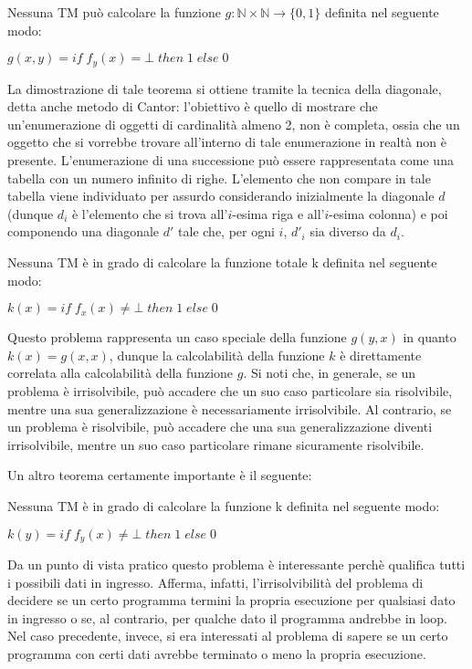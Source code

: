   \begin{theorem} 
    Nessuna TM può calcolare la funzione \(g:\mathbb N\times \mathbb N \to \{0,1\}\) definita nel seguente modo:
    
    \(g(x,y) = if\; f_y(x) = \bot \; then \; 1 \; else \; 0\)
  \end{theorem}

  La dimostrazione di tale teorema si ottiene tramite la tecnica della diagonale, detta anche metodo di Cantor: l'obiettivo è quello di mostrare che un'enumerazione di oggetti di cardinalità almeno 2, non è completa, ossia che un oggetto che si vorrebbe trovare all'interno di tale enumerazione in realtà non è presente. L'enumerazione di una successione può essere rappresentata come una tabella con un numero infinito di righe. L'elemento che non compare in tale tabella viene individuato per assurdo considerando inizialmente la diagonale \(d\) (dunque \(d_i\) è l'elemento che si trova all'\(i\)-esima riga e all'\(i\)-esima colonna) e poi componendo una diagonale \(d'\) tale che, per ogni \(i\), \(d'_i\) sia diverso da \(d_i\).
  
  \begin{theorem}
    Nessuna TM è in grado di calcolare la funzione totale k definita nel seguente modo:

    \(k(x)= if\;f_x(x)\neq\bot\;then\;1\;else\;0\)
  \end{theorem}

  Questo problema rappresenta un caso speciale della funzione \(g(y,x)\) in quanto \(k(x)=g(x,x)\), dunque la calcolabilità della funzione \(k\) è direttamente correlata alla calcolabilità della funzione \(g\).
  Si noti che, in generale, se un problema è irrisolvibile, può accadere che un suo caso particolare sia risolvibile, mentre una sua generalizzazione è necessariamente irrisolvibile. Al contrario, se un problema è risolvibile, può accadere che una sua generalizzazione diventi irrisolvibile, mentre un suo caso particolare rimane sicuramente risolvibile.

  Un altro teorema certamente importante è il seguente:
  \begin{theorem}
    Nessuna TM è in grado di calcolare la funzione k definita nel seguente modo:

    \(k(y)=if\; f_y(x)\neq\bot\;then\;1\;else\;0\)
  \end{theorem}
  
  Da un punto di vista pratico questo problema è interessante perchè qualifica tutti i possibili dati in ingresso. Afferma, infatti, l'irrisolvibilità del problema di decidere se un certo programma termini la propria esecuzione per qualsiasi dato in ingresso o se, al contrario, per qualche dato il programma andrebbe in loop. Nel caso precedente, invece, si era interessati al problema di sapere se un certo programma con certi dati avrebbe terminato o meno la propria esecuzione.
  
